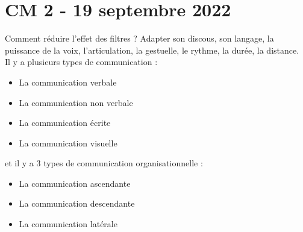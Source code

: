 \documentclass[12pt, a4paper]{article}
\begin{document}
\section{CM 2 - 19 septembre 2022}
Comment réduire l'effet des filtres ? Adapter son discous, son langage, la puissance
de la voix, l'articulation, la gestuelle, le rythme, la durée, la distance. \\

Il y a plusieurs types de communication :
\begin{itemize}
	\item La communication verbale
	\item La communication non verbale
	\item La communication écrite
	\item La communication visuelle\\
\end{itemize}

et il y a 3 types de communication organisationnelle :
\begin{itemize}
	\item La communication ascendante
	\item La communication descendante
	\item La communication latérale
\end{itemize}
\end{document}
